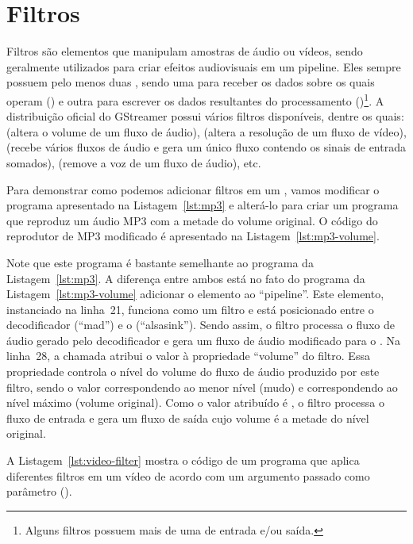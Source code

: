 \section{Filtros}
\label{sec:filtros}
Filtros são elementos que manipulam amostras de áudio ou vídeos, sendo 
geralmente utilizados para criar efeitos audiovisuais em um pipeline. Eles
sempre possuem pelo menos duas , sendo uma para receber os dados
sobre os quais operam () e outra para escrever os dados 
resultantes do processamento ()\footnote{Alguns filtros possuem mais de uma  de entrada e/ou saída.}. A distribuição oficial do
GStreamer possui vários filtros disponíveis, dentre os quais: 
(altera o volume de um fluxo de áudio),  (altera a resolução de
um fluxo de vídeo),  (recebe vários fluxos de áudio e gera um único 
fluxo contendo os sinais de entrada somados),  (remove a voz
de um fluxo de áudio), etc.

Para demonstrar como podemos adicionar filtros em um , vamos 
modificar o programa apresentado na Listagem~\ref{lst:mp3} e alterá-lo para 
criar um programa que reproduz um áudio MP3 com a metade do volume original.
O código do reprodutor de MP3 modificado é apresentado na 
Listagem~\ref{lst:mp3-volume}.



Note que este programa é bastante semelhante ao programa da
Listagem~\ref{lst:mp3}. A diferença entre ambos está no fato do programa da
Listagem~\ref{lst:mp3-volume} adicionar o elemento  ao 
``pipeline''. Este elemento, instanciado na linha~21, funciona como um
filtro e está posicionado entre o decodificador (``mad'') e o 
(``alsasink''). Sendo assim, o filtro  processa o fluxo de áudio
gerado pelo decodificador e gera um fluxo de áudio modificado para o 
. Na linha~28, a chamada  atribui o valor  
à propriedade ``volume'' do filtro. Essa propriedade controla o nível do 
volume do fluxo de áudio produzido por este filtro, sendo o valor  
correspondendo ao menor nível (mudo) e  correspondendo ao nível 
máximo  (volume original). Como o valor atribuído é , o filtro 
processa o fluxo de entrada e gera um fluxo de saída cujo volume é a metade 
do nível original.

A Listagem~\ref{lst:video-filter} mostra o código de um programa que aplica
diferentes filtros em um vídeo de acordo com um argumento passado como
parâmetro (). 

